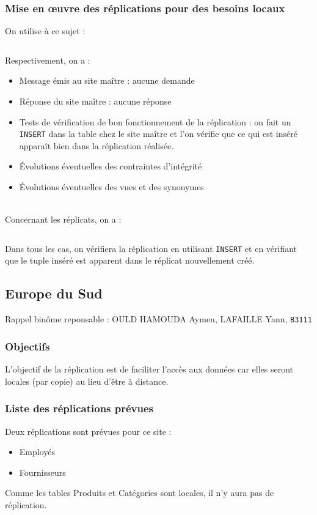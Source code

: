 \documentclass[10pt,a4paper]{article}
\theoremstyle{plain}
\begin{document}
\subsubsection{Mise en \oe uvre des réplications pour des besoins locaux}
On utilise à ce sujet :
\inputminted{sql}{INSA-DB12-EuropeNord-replication.sql}
Respectivement, on a :
\begin{itemize}
    \item Message émis au site maître : aucune demande
    \item Réponse du site maître : aucune réponse
    \item Tests de vérification de bon fonctionnement de la réplication : on fait un \verb|INSERT| dans la table chez le site maître et l'on vérifie que ce qui est inséré apparaît bien dans la réplication réalisée.
    \item Évolutions éventuelles des contraintes d'intégrité
    \item Évolutions éventuelles des vues et des synonymes
\end{itemize}
~\\
Concernant les réplicats, on a :
\inputminted{sql}{INSA-DB12-EuropeNord-vues-replicats.sql}
Dans tous les cas, on vérifiera la réplication en utilisant \verb|INSERT| et en vérifiant que le tuple inséré est apparent dans le réplicat nouvellement créé.

\newpage

\subsection{Europe du Sud}
Rappel binôme reponsable : OULD HAMOUDA Aymen, LAFAILLE Yann, \verb|B3111|

\subsubsection{Objectifs}
L’objectif de la réplication est de faciliter l’accès aux données car elles seront locales (par copie) au lieu d'être à distance.

\subsubsection{Liste des réplications prévues}
Deux réplications sont prévues pour ce site :
\begin{itemize}
    \item Employés
    \item Fournisseurs
\end{itemize}
Comme les tables Produits et Catégories sont locales, il n'y aura pas de réplication.
\end{document}
